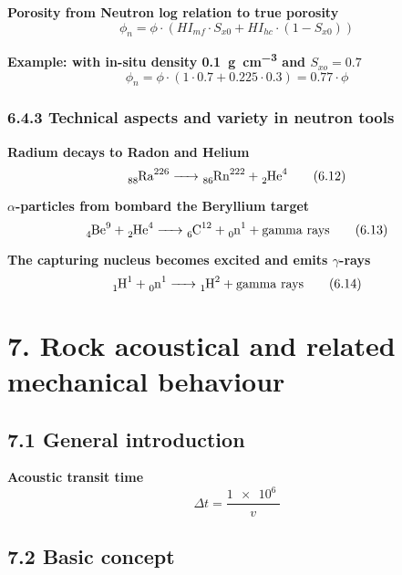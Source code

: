 \textbf{Porosity from Neutron log relation to true porosity}
\begin{equation*}
    \phi_n = \phi\cdot\left(\mathit{HI}_{mf}\cdot S_{x0} + \mathit{HI}_{hc}\cdot(1-S_{x0})\right)\tag{6.10}
\end{equation*}

\textbf{Example:  with in-situ density \SI{0.1}{\gram\per\cubic\centi\meter} and $S_{xo}=0.7$}
\begin{equation*}
    \phi_n = \phi\cdot\left(1\cdot0.7 + 0.225\cdot0.3\right) = 0.77\cdot\phi\tag{6.11}
\end{equation*}

\subsubsection{6.4.3 Technical aspects and variety in neutron tools}
\textbf{Radium decays to Radon and Helium}
\begin{equation*}
    \ce{_{88}Ra^{226} -> _{86}Rn^{222} + _{2}He^{4}}\tag{6.12}
\end{equation*}

\textbf{$\alpha$-particles from  bombard the Beryllium target}
\begin{equation*}
    \ce{_{4}Be^{9} + _{2}He^{4} -> _{6}C^{12} + _0n^1} + \mathrm{gamma\ rays}\tag{6.13}
\end{equation*}

\textbf{The capturing nucleus becomes excited and emits $\gamma$-rays}
\begin{equation*}
    \ce{_{1}H^{1} + _0n^1 -> _{1}H^{2}} + \mathrm{gamma\ rays}\tag{6.14}
\end{equation*}

\section{7. Rock acoustical and related mechanical behaviour}
\subsection{7.1 General introduction}
\textbf{Acoustic transit time}
\begin{equation*}
    \Delta t = \frac{\SI{1e6}{}}{v}\tag{7.1}
\end{equation*}

\subsection{7.2 Basic concept}
